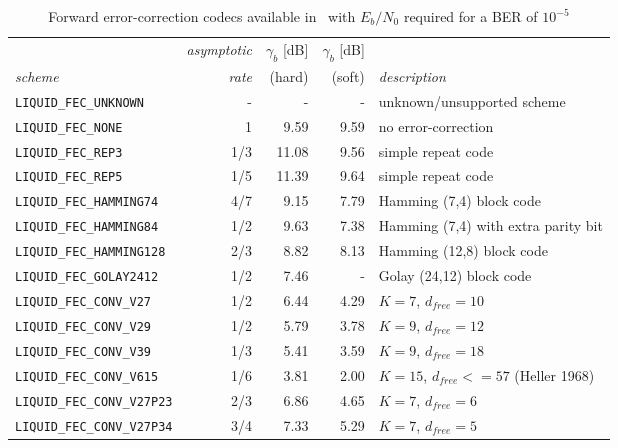 \begin{table*}
\caption{Forward error-correction codecs available in \liquid\
         with $E_b/N_0$ required for a BER of $10^{-5}$}
\label{tab:fec:codecs}
\centering
{\small
\begin{tabular*}{0.95\textwidth}{l@{\extracolsep{\fill}}rrrl}
\toprule
             & {\it asymptotic} & {\it $\gamma_b$} [dB] & {\it $\gamma_b$} [dB] & \\
{\it scheme} & {\it rate}       & (hard)                & (soft)                & {\it description}\\\otoprule
%
{\tt LIQUID\_FEC\_UNKNOWN}      & -       &     - &     - & unknown/unsupported scheme\\
{\tt LIQUID\_FEC\_NONE}         & 1       &  9.59 &  9.59 & no error-correction\\
{\tt LIQUID\_FEC\_REP3}         & 1/3     & 11.08 &  9.56 & simple repeat code\\
{\tt LIQUID\_FEC\_REP5}         & 1/5     & 11.39 &  9.64 & simple repeat code\\
{\tt LIQUID\_FEC\_HAMMING74}    & 4/7     &  9.15 &  7.79 & Hamming (7,4) block code\\
{\tt LIQUID\_FEC\_HAMMING84}    & 1/2     &  9.63 &  7.38 & Hamming (7,4) with extra parity bit\\
{\tt LIQUID\_FEC\_HAMMING128}   & 2/3     &  8.82 &  8.13 & Hamming (12,8) block code\\
{\tt LIQUID\_FEC\_GOLAY2412}    & 1/2     &  7.46 &     - & Golay (24,12) block code\\\midrule
%
{\tt LIQUID\_FEC\_CONV\_V27}    & 1/2     &  6.44 & 4.29 & $K=7$, $d_{free}=10$\\
{\tt LIQUID\_FEC\_CONV\_V29}    & 1/2     &  5.79 & 3.78 & $K=9$, $d_{free}=12$\\
{\tt LIQUID\_FEC\_CONV\_V39}    & 1/3     &  5.41 & 3.59 & $K=9$, $d_{free}=18$\\
{\tt LIQUID\_FEC\_CONV\_V615}   & 1/6     &  3.81 & 2.00 & $K=15$, $d_{free}<=57$ (Heller 1968)\\\midrule
%
{\tt LIQUID\_FEC\_CONV\_V27P23} & 2/3     &  6.86 & 4.65 & $K=7$, $d_{free}=6$\\
{\tt LIQUID\_FEC\_CONV\_V27P34} & 3/4     &  7.33 & 5.29 & $K=7$, $d_{free}=5$\\

\end{tabular*}}
\end{table*}
